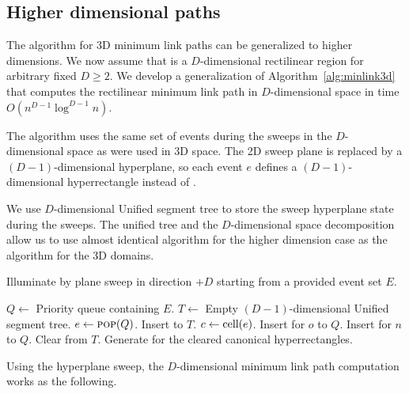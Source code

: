\documentclass[english,gradu]{tktltiki2018}
\begin{document}
\subsection{Higher dimensional paths}

The algorithm for 3D minimum link paths can be generalized to higher dimensions.
We now assume that \fspace is a $D$-dimensional rectilinear region for arbitrary fixed $D\ge 2$.
We develop a generalization of Algorithm~\ref{alg:minlink3d} that computes the rectilinear minimum link path in $D$-dimensional space in time $O(n^{D-1}\log^{D-1}n)$.

The algorithm uses the same set of events during the sweeps in the $D$-dimensional space as were used in 3D space.
The 2D sweep plane is replaced by a $(D-1)$-dimensional hyperplane, so each event $e$ defines a $(D-1)$-dimensional hyperrectangle  instead of .

We use $D$-dimensional Unified segment tree to store the sweep hyperplane state during the sweeps.
The unified tree and the $D$-dimensional space decomposition allow us to use almost identical algorithm for the higher dimension case as the algorithm for the 3D domains.

\begin{alg}\label{alg:sweepdd}
Illuminate by plane sweep in direction $+D$ starting from a provided event set $E$.
\begin{algorithmic}
\State $Q\gets$ Priority queue containing $E$.
\State $T\gets$ Empty $(D-1)$-dimensional Unified segment tree.
	\State $e\gets\textsc{pop}(Q)$.
		\State Insert  to $T$.
			\State $c\gets\text{cell}(e)$.
				\State Insert \obsE for $o$ to $Q$.
			\EndFor
				\State Insert \cellE for $n$ to $Q$.
			\EndFor
		\EndIf
		\State Clear  from $T$.
		\State Generate \addEs for the cleared canonical hyperrectangles.
	\EndIf
\EndWhile
\end{algorithmic}
\end{alg}

Using the hyperplane sweep, the $D$-dimensional minimum link path computation works as the following.
\end{document}
